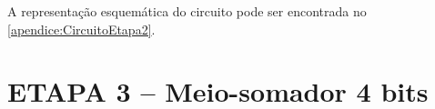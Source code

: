 		A representação esquemática do circuito pode ser encontrada no \autoref{apendice:CircuitoEtapa2}.
	\section{ETAPA 3 – Meio-somador 4 bits}








